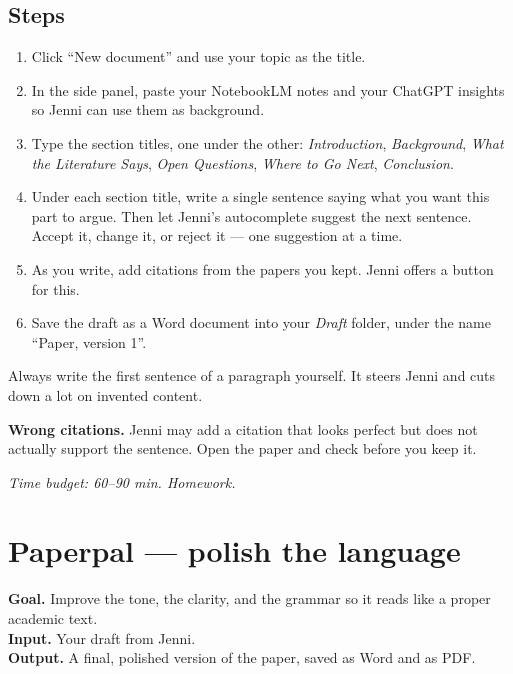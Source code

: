 \documentclass[11pt,a4paper]{article}
\begin{document}
\subsection*{Steps}
\begin{enumerate}[leftmargin=*, itemsep=2pt]
  \item Click ``New document'' and use your topic as the title.
  \item In the side panel, paste your NotebookLM notes and your ChatGPT insights so Jenni can use them as background.
  \item Type the section titles, one under the other: \emph{Introduction}, \emph{Background}, \emph{What the Literature Says}, \emph{Open Questions}, \emph{Where to Go Next}, \emph{Conclusion}.
  \item Under each section title, write a single sentence saying what you want this part to argue. Then let Jenni's autocomplete suggest the next sentence. Accept it, change it, or reject it --- one suggestion at a time.
  \item As you write, add citations from the papers you kept. Jenni offers a button for this.
  \item Save the draft as a Word document into your \emph{Draft} folder, under the name ``Paper, version 1''.
\end{enumerate}

\begin{tipbox}
Always write the first sentence of a paragraph yourself. It steers Jenni and cuts down a lot on invented content.
\end{tipbox}

\begin{watchout}
\textbf{Wrong citations.} Jenni may add a citation that looks perfect but does not actually support the sentence. Open the paper and check before you keep it.
\end{watchout}

\textit{Time budget: 60--90 min. Homework.}

\section{Paperpal --- polish the language}
\label{sec:paperpal}

\begin{toolheader}
\textbf{Goal.} Improve the tone, the clarity, and the grammar so it reads like a proper academic text.\\
\textbf{Input.} Your draft from Jenni.\\
\textbf{Output.} A final, polished version of the paper, saved as Word and as PDF.
\end{toolheader}
\end{document}
